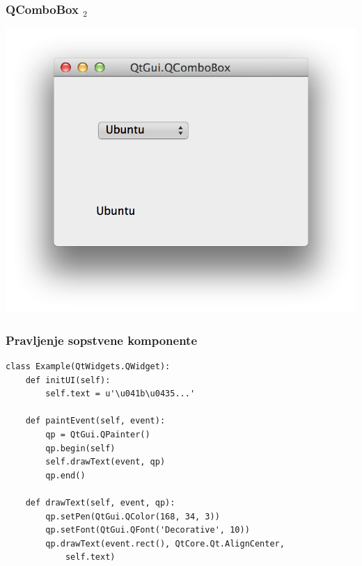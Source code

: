 \documentclass[utf8,compress]{beamer}
\begin{document}
\begin{frame}[fragile]
  \frametitle{QComboBox $_2$}
\begin{center}
\includegraphics[scale=0.5]{pyqt16.png}
\end{center}
\end{frame}

\begin{frame}
  \frametitle{Pravljenje sopstvene komponente}
\begin{verbatim}
class Example(QtWidgets.QWidget):
    def initUI(self):
        self.text = u'\u041b\u0435...'

    def paintEvent(self, event):
        qp = QtGui.QPainter()
        qp.begin(self)
        self.drawText(event, qp)
        qp.end()
        
    def drawText(self, event, qp):
        qp.setPen(QtGui.QColor(168, 34, 3))
        qp.setFont(QtGui.QFont('Decorative', 10))
        qp.drawText(event.rect(), QtCore.Qt.AlignCenter, 
            self.text)        
\end{verbatim}
\end{frame}
\end{document}
